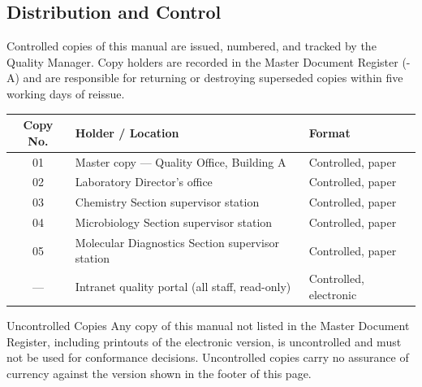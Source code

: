 \subsection{Distribution and Control}

Controlled copies of this manual are issued, numbered, and tracked by the Quality Manager.
Copy holders are recorded in the Master Document Register (\doccode-A) and are responsible
for returning or destroying superseded copies within five working days of reissue.

\begin{table}[h]
\centering
\small
\renewcommand{\arraystretch}{1.3}
\begin{tabularx}{\linewidth}{@{}c X l@{}}
\toprule
\textbf{Copy No.} & \textbf{Holder / Location} & \textbf{Format} \\
\midrule
01 & Master copy --- Quality Office, Building A & Controlled, paper \\
02 & Laboratory Director's office & Controlled, paper \\
03 & Chemistry Section supervisor station & Controlled, paper \\
04 & Microbiology Section supervisor station & Controlled, paper \\
05 & Molecular Diagnostics Section supervisor station & Controlled, paper \\
--- & Intranet quality portal (all staff, read-only) & Controlled, electronic \\
\bottomrule
\end{tabularx}
\end{table}

\begin{notebox}{Uncontrolled Copies}
Any copy of this manual not listed in the Master Document Register, including printouts of
the electronic version, is uncontrolled and must not be used for conformance decisions.
Uncontrolled copies carry no assurance of currency against the version shown in the footer
of this page.
\end{notebox}
